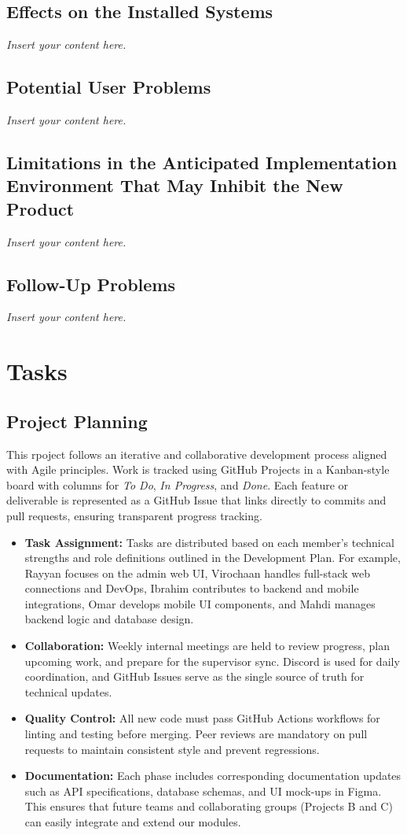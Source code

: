 \documentclass[12pt]{article}
\newcommand{\lips}{\textit{Insert your content here.}}
\begin{document}
\subsection{Effects on the Installed Systems}
\lips
\subsection{Potential User Problems}
\lips
\subsection{Limitations in the Anticipated Implementation Environment That May
Inhibit the New Product}
\lips
\subsection{Follow-Up Problems}
\lips

\section{Tasks}
\subsection{Project Planning}

This rpoject follows an iterative and collaborative development process aligned with Agile principles.  
Work is tracked using GitHub Projects in a Kanban-style board with columns for \textit{To Do}, \textit{In Progress}, and \textit{Done}.  
Each feature or deliverable is represented as a GitHub Issue that links directly to commits and pull requests, ensuring transparent progress tracking.

\begin{itemize}
    \item \textbf{Task Assignment:} Tasks are distributed based on each member’s technical strengths and role definitions outlined in the Development Plan.  
    For example, Rayyan focuses on the admin web UI, Virochaan handles full-stack web connections and DevOps, Ibrahim contributes to backend and mobile integrations, Omar develops mobile UI components, and Mahdi manages backend logic and database design.
    \item \textbf{Collaboration:} Weekly internal meetings are held to review progress, plan upcoming work, and prepare for the supervisor sync.  
    Discord is used for daily coordination, and GitHub Issues serve as the single source of truth for technical updates.
    \item \textbf{Quality Control:} All new code must pass GitHub Actions workflows for linting and testing before merging.  
    Peer reviews are mandatory on pull requests to maintain consistent style and prevent regressions.
    \item \textbf{Documentation:} Each phase includes corresponding documentation updates such as API specifications, database schemas, and UI mock-ups in Figma.  
    This ensures that future teams and collaborating groups (Projects B and C) can easily integrate and extend our modules.
\end{itemize}
\end{document}

